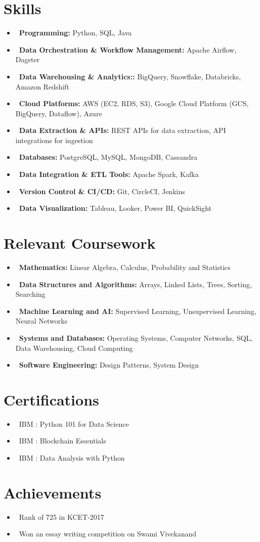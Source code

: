 \documentclass[letterpaper,10.99pt]{article}
\newcommand{\resumeItem}[1]{\item\small{#1}}
\newcommand{\resumeSubHeadingList}{\begin{itemize}[leftmargin=0.10in, label={}]}
\newcommand{\resumeSubHeadingListEnd}{\end{itemize}}
\begin{document}
\begin{minipage}[t]{0.33\textwidth}




\section{Skills}
\resumeSubHeadingList
\resumeItem{\textbullet\ \textbf{Programming:} Python, SQL, Java}
\resumeItem{\textbullet\ \textbf{Data Orchestration \& Workflow Management:} Apache Airflow, Dagster}
\resumeItem{\textbullet\ \textbf{Data Warehousing \& Analytics::} BigQuery, Snowflake, Databricks, Amazon Redshift}
\resumeItem{\textbullet\ \textbf{Cloud Platforms:} AWS (EC2, RDS, S3), Google Cloud Platform (GCS, BigQuery, Dataflow), Azure}
\resumeItem{\textbullet\ \textbf{Data Extraction \& APIs:} REST APIs for data extraction, API integrations for ingestion}
\resumeItem{\textbullet\ \textbf{Databases:} PostgreSQL, MySQL, MongoDB, Cassandra}
\resumeItem{\textbullet\ \textbf{Data Integration \& ETL Tools:} Apache Spark, Kafka}
\resumeItem{\textbullet\ \textbf{Version Control \& CI/CD:} Git, CircleCI, Jenkins}
\resumeItem{\textbullet\ \textbf{Data Visualization:} Tableau, Looker, Power BI, QuickSight}
\resumeSubHeadingListEnd
\sectionsep


\section{Relevant Coursework}
\resumeSubHeadingList
\resumeItem{\textbullet\ \textbf{Mathematics:} Linear Algebra, Calculus, Probability and Statistics}
\resumeItem{\textbullet\ \textbf{Data Structures and Algorithms:} Arrays, Linked Lists, Trees, Sorting, Searching}
\resumeItem{\textbullet\ \textbf{Machine Learning and AI:} Supervised Learning, Unsupervised Learning, Neural Networks}
\resumeItem{\textbullet\ \textbf{Systems and Databases:} Operating Systems, Computer Networks, SQL, Data Warehousing, Cloud Computing}
\resumeItem{\textbullet\ \textbf{Software Engineering:} Design Patterns, System Design}
\resumeSubHeadingListEnd
\sectionsep
    

\section{Certifications}
\resumeSubHeadingList
\resumeItem{\textbullet\ IBM : Python 101 for Data Science}
\resumeItem{\textbullet\ IBM : Blockchain Essentials}
\resumeItem{\textbullet\ IBM : Data Analysis with Python}
\resumeSubHeadingListEnd

\section{Achievements}
\resumeSubHeadingList
\resumeItem{\textbullet\ Rank of 725 in KCET-2017}
\resumeItem{\textbullet\ Won an essay writing competition on Swami Vivekanand}
\resumeSubHeadingListEnd

\end{minipage}
\end{document}
